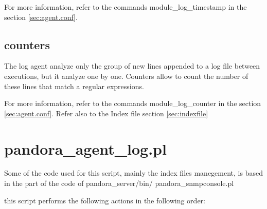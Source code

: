 \documentclass[a4paper,10pt]{article}
\begin{document}
For more information, refer to the commands  module\_log\_timestamp  in the section \ref{sec:agent.conf}.

\subsection{counters}

The log agent analyze only the group of new lines appended to a log file between executions, but it analyze one by one. Counters allow to count the number of these lines that match a regular expressions. 

For more information, refer to the commands  module\_log\_counter  in the section \ref{sec:agent.conf}. Refer also to the Index file section \ref{sec:indexfile}



\section{pandora\_agent\_log.pl}
    
      Some of the code used for this script, mainly the index files manegement,
      is based in the part of the code of pandora\_server/bin/
      pandora\_snmpconsole.pl
    
    
      this script performs the following actions in the following order:
    
\end{document}
